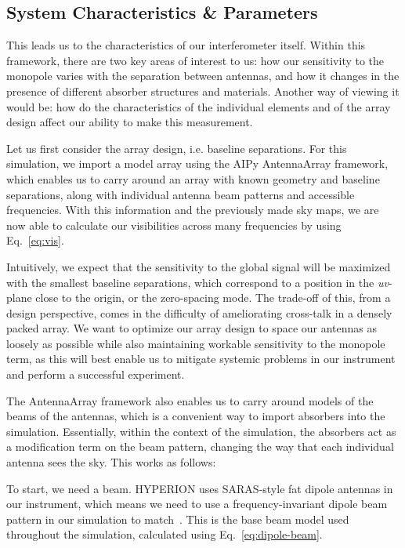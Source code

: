 \subsection{System Characteristics \& Parameters}

This leads us to the characteristics of our interferometer itself. Within this 
framework, there are two key areas of interest to us: how our sensitivity to 
the monopole varies with the separation between antennas, and how it changes in 
the presence of different absorber structures and materials. Another way of 
viewing it would be: how do the characteristics of the individual elements and 
of the array design affect our ability to make this measurement.

Let us first consider the array design, i.e. baseline separations. For this 
simulation, we import a model array using the AIPy AntennaArray framework, 
which enables us to carry around an array with known geometry and baseline 
separations, along with individual antenna beam patterns and accessible 
frequencies. With this information and the previously made sky maps, we are now 
able to calculate our visibilities across many frequencies by using 
Eq.~\eqref{eq:vis}.

Intuitively, we expect that the sensitivity to the global signal will be 
maximized with the smallest baseline separations, which correspond to a 
position in the \emph{uv}-plane close to the origin, or the zero-spacing mode.  
The trade-off of this, from a design perspective, comes in the difficulty of 
ameliorating cross-talk in a densely packed array. We want to optimize our 
array design to space our antennas as loosely as possible while also 
maintaining workable sensitivity to the monopole term, as this will best enable 
us to mitigate systemic problems in our instrument and perform a successful 
experiment.

The AntennaArray framework also enables us to carry around models of the beams 
of the antennas, which is a convenient way to import absorbers into the 
simulation. Essentially, within the context of the simulation, the absorbers 
act as a modification term on the beam pattern, changing the way that each 
individual antenna sees the sky. This works as follows:

To start, we need a beam. HYPERION uses SARAS-style fat dipole antennas in our 
instrument, which means we need to use a frequency-invariant dipole beam 
pattern in our simulation to match~\citep{patra2013}. This is the base beam 
model used throughout the simulation, calculated using 
Eq.~\eqref{eq:dipole-beam}.

